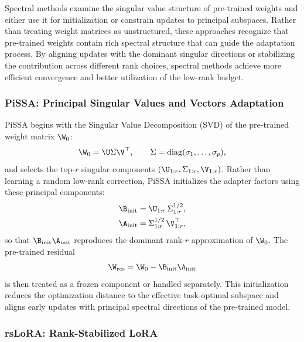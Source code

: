 Spectral methods examine the singular value structure of pre-trained weights and either use it for initialization or constrain updates to principal subspaces. Rather than treating weight matrices as unstructured, these approaches recognize that pre-trained weights contain rich spectral structure that can guide the adaptation process. By aligning updates with the dominant singular directions or stabilizing the contribution across different rank choices, spectral methods achieve more efficient convergence and better utilization of the low-rank budget.

\subsubsection{PiSSA: Principal Singular Values and Vectors Adaptation \cite{meng2024pissa}}
\label{subsubsec:pissa}

PiSSA begins with the Singular Value Decomposition (SVD) of the pre-trained weight matrix $\W_0$:
\begin{equation}
  \W_0 = \U \Sigma \V^\top,\qquad \Sigma=\mathrm{diag}(\sigma_1,\dots,\sigma_p),
\end{equation}
and selects the top-$r$ singular components $(\U_{1:r},\Sigma_{1:r},\V_{1:r})$. Rather than learning a random low-rank correction, PiSSA initializes the adapter factors using these principal components:
\begin{align}
  \B_{\text{init}} &= \U_{1:r}\,\Sigma_{1:r}^{1/2}, \\
  \A_{\text{init}} &= \Sigma_{1:r}^{1/2}\,\V_{1:r}^\top,
\end{align}
so that $\B_{\text{init}}\A_{\text{init}}$ reproduces the dominant rank-$r$ approximation of $\W_0$. The pre-trained residual
\begin{equation}
  \W_{\text{res}} = \W_0 - \B_{\text{init}}\A_{\text{init}}
\end{equation}
is then treated as a frozen component or handled separately. This initialization reduces the optimization distance to the effective task-optimal subspace and aligns early updates with principal spectral directions of the pre-trained model.

\subsubsection{rsLoRA: Rank-Stabilized LoRA \cite{kalajdzievski2023rslora}}
\label{subsubsec:rslora}

